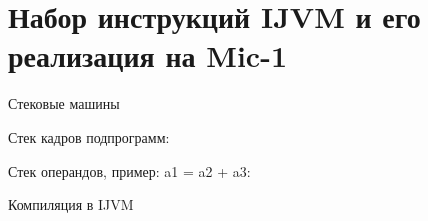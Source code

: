 \section[IJVM]{Набор инструкций IJVM и его реализация на Mic-1}

\begin{frame}{Стековые машины}

    \pause
    Стек кадров подпрограмм:
    \pause

    Стек операндов, пример: a1 = a2 + a3:
    \pause{}

    \pause
    \vspace{-.2cm}{\small Стековые машины vs. регистровые машины.}
\end{frame}



\begin{frame}{Компиляция в IJVM}
\end{frame}

